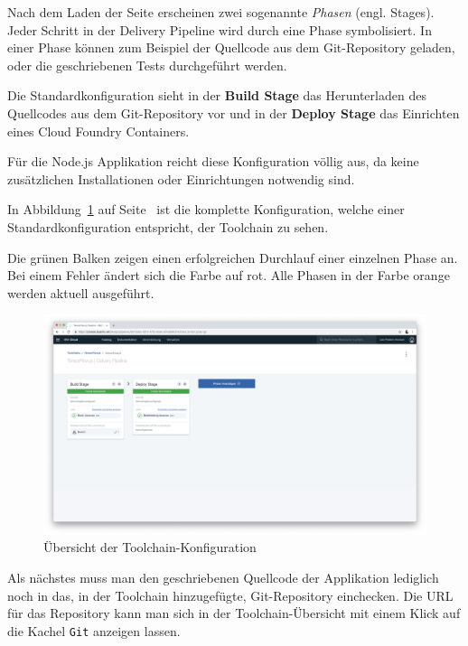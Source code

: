 Nach dem Laden der Seite erscheinen zwei sogenannte \textit{Phasen} (engl. Stages). Jeder Schritt in der Delivery
Pipeline wird durch eine Phase symbolisiert. In einer Phase können zum Beispiel der Quellcode aus dem Git-Repository
geladen, oder die geschriebenen Tests durchgeführt werden.

Die Standardkonfiguration sieht in der \textbf{Build Stage} das Herunterladen des Quellcodes aus dem Git-Repository vor
und in der \textbf{Deploy Stage} das Einrichten eines Cloud Foundry Containers.

Für die Node.js Applikation reicht diese Konfiguration völlig aus, da keine zusätzlichen Installationen oder
Einrichtungen notwendig sind.

In Abbildung~\ref{fig:umsetzung_toolchain_pipeline} auf Seite~\pageref{fig:umsetzung_toolchain_pipeline} ist die
komplette Konfiguration, welche einer Standardkonfiguration entspricht, der Toolchain zu sehen.

Die grünen Balken zeigen einen erfolgreichen Durchlauf einer einzelnen Phase an. Bei einem Fehler ändert sich die Farbe
auf rot. Alle Phasen in der Farbe orange werden aktuell ausgeführt.

\begin{figure}[h]
    \centering
    \includegraphics[width=\textwidth]{images/kapitel_3/toolchain_pipeline.png}
    \caption{Übersicht der Toolchain-Konfiguration}
    \label{fig:umsetzung_toolchain_pipeline}
\end{figure}

Als nächstes muss man den geschriebenen Quellcode der Applikation lediglich noch in das, in der Toolchain hinzugefügte,
Git-Repository einchecken. Die URL für das Repository kann man sich in der Toolchain-Übersicht mit einem Klick auf die
Kachel \texttt{Git} anzeigen lassen.

